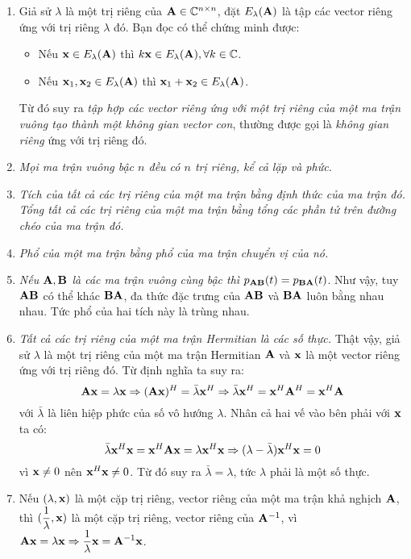 \def\ElA{E_{\lambda}(\bA)}
\begin{enumerate}
\item Giả sử $\lambda$ là một trị riêng của $\mathbf{A} \in \mathbb{C}^{n\times n}$, đặt $\ElA$ là tập các vector riêng ứng với trị riêng $\lambda$ đó. Bạn đọc có thể chứng minh được:
\begin{itemize}
\item Nếu $\bx \in \ElA$ thì $k\bx \in \ElA, \forall k \in \mathbb{C}$.

\item Nếu $\bx_1, \bx_2 \in \ElA$ thì $\bx_1 + \bx_2 \in \ElA$.
\end{itemize}
Từ đó suy ra \textit{tập hợp các vector riêng ứng với một trị riêng của một
ma trận vuông tạo thành một không gian vector con}, thường được gọi là
\textit{không gian riêng} ứng với trị riêng đó.

\item \textit{Mọi ma trận vuông bậc $n$ đều có $n$ trị riêng, kể cả lặp và phức.}

\item \textit{Tích của tất cả các trị riêng của một ma trận bằng định thức
của ma trận đó. Tổng tất cả các trị riêng của một ma trận bằng tổng các
phần tử trên đường chéo của ma trận đó.}


\item \textit{Phổ của một ma trận bằng phổ của ma trận chuyển vị của nó.}


\item \textit{Nếu $\mathbf{A}, \mathbf{B}$ là các ma trận vuông cùng bậc thì
$p_{\mathbf{A}\mathbf{B}}(t) = p_ {\mathbf{B}\mathbf{A}}(t)$}. Như vậy, tuy $\mathbf{A}\mathbf{B}$ có thể khác
$\mathbf{B}\mathbf{A}$, đa thức đặc trưng của $\mathbf{A}\mathbf{B}$ và $\mathbf{B}\mathbf{A}$ luôn bằng nhau
nhau. Tức phổ của hai tích này là trùng nhau.

\item \textit{Tất cả các trị riêng của một ma trận Hermitian là các số
thực.} Thật vậy, giả sử $\lambda$ là một trị riêng của một ma trận Hermitian $\mathbf{A}$ và $\mathbf{x}$ là một vector riêng ứng với trị riêng đó. Từ định nghĩa ta
suy ra:
\begin{equation}
\mathbf{A}\mathbf{x} = \lambda\mathbf{x} \Rightarrow (\mathbf{A}\mathbf{x})^H = \bar{\lambda} \mathbf{x}^H
\Rightarrow  \bar{\lambda}\mathbf{x}^H = \mathbf{x}^H\mathbf{A}^H = \mathbf{x}^H\mathbf{A}
\end{equation}
với $\bar{\lambda}$ là liên hiệp phức của số vô hướng $\lambda$. Nhân cả hai
vế vào bên phải với $\mathbf{x}$ ta có:
\begin{equation}
\bar{\lambda}\mathbf{x}^H\mathbf{x} = \mathbf{x}^H\mathbf{A}\mathbf{x} = \lambda \mathbf{x}^H \mathbf{x} \Rightarrow
(\lambda - \bar{\lambda})\mathbf{x}^H\mathbf{x} = 0
\end{equation}
vì $\mathbf{x} \neq 0$ nên $\mathbf{x}^H\mathbf{x} \neq 0$. Từ đó suy ra $\bar{\lambda} =
\lambda$, tức $\lambda$ phải là một số thực.

\item Nếu $(\lambda, \mathbf{x})$ là một cặp trị riêng, vector riêng của một ma
trận khả nghịch $\mathbf{A}$, thì $\displaystyle(\frac{1}{\lambda}, \mathbf{x})$ là một
cặp trị riêng, vector riêng của $\mathbf{A}^{-1}$, vì $\displaystyle \mathbf{A}\mathbf{x} =
\lambda\mathbf{x} \Rightarrow \frac{1} {\lambda}\mathbf{x} = \mathbf{A}^{-1}\mathbf{x}$.


\end{enumerate}


